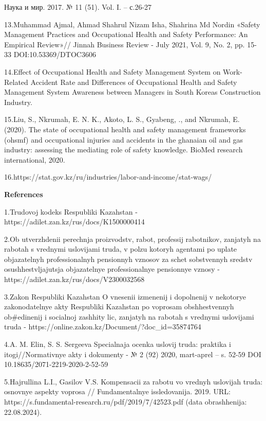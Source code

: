 Наука и мир. 2017. № 11 (51). Vol. I. -- с.26-27

13.Muhammad Ajmal, Ahmad Shahrul Nizam Isha, Shahrina Md Nordin «Safety
Management Practices and Occupational Health and Safety Performance: An
Empirical Review»// Jinnah Business Review - July 2021, Vol. 9, No. 2,
pp. 15-33 DOI:10.53369/DTOC3606

14.Effect of Occupational Health and Safety Management System on
Work-Related Accident Rate and Differences of Occupational Health and
Safety Management System Awareness between Managers in South
Korea\textquotesingle s Construction Industry.

15.Liu, S., Nkrumah, E. N. K., Akoto, L. S., Gyabeng, ., and Nkrumah, E.
(2020). The state of occupational health and safety management
frameworks (ohsmf) and occupational injuries and accidents in the
ghanaian oil and gas industry: assessing the mediating role of safety
knowledge. BioMed research international, 2020.

16.https://stat.gov.kz/ru/industries/labor-and-income/stat-wags/

{\bfseries References}

1.Trudovoj kodeks Respubliki Kazahstan -
https://adilet.zan.kz/rus/docs/K1500000414

2.Ob utverzhdenii perechnja proizvodstv, rabot, professij rabotnikov,
zanjatyh na rabotah s vrednymi uslovijami truda, v
pol\textquotesingle zu kotoryh agentami po uplate
objazatel\textquotesingle nyh professional\textquotesingle nyh
pensionnyh vznosov za schet sobstvennyh sredstv osushhestvljajutsja
objazatel\textquotesingle nye professional\textquotesingle nye
pensionnye vznosy - https://adilet.zan.kz/rus/docs/V2300032568

3.Zakon Respubliki Kazahstan O vnesenii izmenenij i dopolnenij v
nekotorye zakonodatel\textquotesingle nye akty Respubliki Kazahstan po
voprosam obshhestvennyh ob\#edinenij i social\textquotesingle noj
zashhity lic, zanjatyh na rabotah s vrednymi uslovijami truda -
https://online.zakon.kz/Document/?doc\_id=35874764

4.A. M. Elin, S. S. Sergeeva Special\textquotesingle naja ocenka uslovij
truda: praktika i itogi//Normativnye akty i dokumenty - № 2 (92) 2020,
mart-aprel\textquotesingle{} -- s. 52-59 DOI
10.18635/2071-2219-2020-2-52-59

5.Hajrullina L.I., Gasilov V.S. Kompensacii za rabotu vo vrednyh
uslovijah truda: osnovnye aspekty voprosa //
Fundamental\textquotesingle nye issledovanija. 2019. URL:
https://s.fundamental-research.ru/pdf/2019/7/42523.pdf (data
obrashhenija: 22.08.2024).

